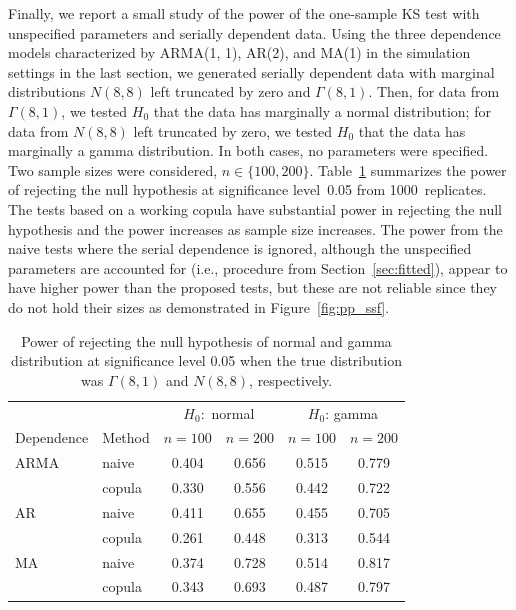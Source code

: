 \documentclass[12pt, letterpaper]{article}
\begin{document}
Finally, we report a small study of the power of the one-sample KS test with
unspecified parameters and serially dependent data. Using the three dependence
models characterized by ARMA(1, 1), AR(2), and MA(1) in the simulation settings
in the last section, we generated serially
dependent data with marginal distributions $N(8, 8)$ left truncated by zero and
$\Gamma(8, 1)$. 
Then, for data from $\Gamma(8, 1)$, we tested $H_0$ that the
data has marginally a normal distribution; for data from $N(8, 8)$ left
truncated by zero, we tested $H_0$ that the data has marginally a gamma
distribution.  In both cases, no parameters were specified. Two sample sizes
were considered, $n \in \{100, 200\}$. Table~\ref{tab:power} summarizes the
power of rejecting the null hypothesis at significance level~0.05 from
1000~replicates. The tests
based on a working copula have substantial power in rejecting the null
hypothesis and the power increases as sample size increases. The power from the
naive tests where the serial dependence is ignored, although the unspecified
parameters are accounted for (i.e., procedure from 
Section~\ref{sec:fitted}), appear to 
have higher power than the proposed tests, but these are not reliable since they 
do not hold their sizes as demonstrated in Figure~\ref{fig:pp_ssf}.

\begin{table}[tbp]
  \label{tab:power}
  \caption{Power of rejecting the null hypothesis of normal and gamma
    distribution at significance level 0.05 when the true distribution was
    $\Gamma(8, 1)$ and $N(8, 8)$, respectively. }
\centering
\begin{tabular}{ll cccc}
  \toprule
  &  & \multicolumn{2}{c}{$H_0:$ normal} &
  \multicolumn{2}{c}{$H_0$: gamma}\\
  \cmidrule(lr){3-4}\cmidrule(lr){5-6}
  Dependence & Method & $n = 100$ & $n = 200$ & $n = 100$ & $n = 200$\\
  \midrule
ARMA & naive & 0.404 & 0.656 & 0.515 & 0.779 \\ 
 & copula & 0.330 & 0.556 & 0.442 & 0.722 \\ 
AR & naive & 0.411 & 0.655 & 0.455 & 0.705 \\ 
& copula & 0.261 & 0.448 & 0.313 & 0.544 \\ 
MA & naive & 0.374 & 0.728 & 0.514 & 0.817 \\ 
& copula & 0.343 & 0.693 & 0.487 & 0.797 \\ 
   \bottomrule
\end{tabular}
\end{table}
\end{document}
